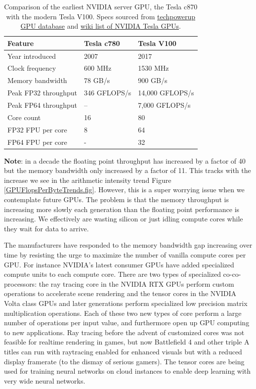 \begin{table}[htbp!]
    \centering
    \begin{tabular}{l||l|l} \hline
 Feature          & Tesla c780 & Tesla V100 \\ \hline
Year introduced  & 2007       & 2017 \\  \hline
Clock frequency  & 600 MHz     & 1530 MHz \\
Memory bandwidth & 78 GB/s     & 900 GB/s \\
Peak FP32 throughput  & 346 GFLOPS/s & 14,000 GFLOPS/s \\
Peak FP64 throughput  & -- & 7,000 GFLOPS/s \\ \hline
Core count & 16 & 80 \\ 
FP32 FPU per core & 8 & 64 \\
FP64 FPU per core & - & 32 \\ \hline
    \end{tabular}
    \caption{Comparison of the earliest NVIDIA server GPU, the Tesla c870 with the modern Tesla V100. Specs sourced from \href{https://www.techpowerup.com/gpu-specs/tesla-c870.c1542}{techpowerup GPU database} and \href{https://en.wikipedia.org/wiki/Nvidia_Tesla}{wiki list of NVIDIA Tesla GPUs}. }
    \label{GPUComparison.tab}
\end{table}

{\bf Note}: in a decade the floating point throughput has increased by a factor of 40 but the memory bandwidth only increased by a factor of 11. This tracks with the increase we see in the arithmetic intensity trend Figure \ref{GPUFlopsPerByteTrends.fig}. However, this is a super worrying issue when we contemplate future GPUs. The problem is that the memory throughput is increasing more slowly each generation than the floating point performance is increasing. We effectively are wasting silicon or just idling compute cores while they wait for data to arrive. 

The manufacturers have responded to the memory bandwidth gap increasing over time by resisting the urge to maximize the number of vanilla compute cores per GPU. For instance NVIDIA's latest consumer GPUs have added specialized compute units to each compute core. There are two types of specialized co-co-processors: the ray tracing core in the NVIDIA RTX GPUs  perform custom operations to accelerate scene rendering and the tensor cores in the NVIDIA Volta class GPUs and later generations perform specialized low precision matrix multiplication operations. Each of these two new types of core perform a large number of operations per input value, and furthermore open up GPU computing to new applications. Ray tracing before the advent of customized cores was not feasible for realtime rendering in games, but now Battlefield 4 and other triple A titles can run with raytracing enabled for enhanced visuals but with a reduced display framerate (to the dismay of serious gamers). The tensor cores are being used for training neural networks on cloud instances to enable deep learning with very wide neural networks. 

